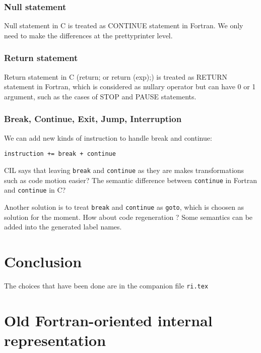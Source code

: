 \documentclass[a4paper]{report}
\begin{document}
\subsection{Null statement}
Null statement in C is treated as CONTINUE statement in Fortran. We only need to make the
differences at the prettyprinter level. 

\subsection{Return statement}
Return statement in C (return; or return (exp);) is treated as RETURN statement in Fortran, which is
considered as nullary operator but can have 0 or 1 argument, such as the
cases of STOP and PAUSE statements. 

\subsection{Break, Continue, Exit, Jump, Interruption}

We can add new kinds of instruction to handle break and continue: 

\verb/instruction += break + continue /

CIL says that leaving \verb/break/ and \verb/continue/ as they are  makes transformations such as code motion
easier? The semantic difference between \verb/continue/ in Fortran and
\verb/continue/ in C?

Another solution is to treat \verb/break/ and \verb/continue/ as
\verb/goto/, which is choosen as solution for the moment. How about code
regeneration ? Some semantics can be added into the generated label names.

\chapter*{Conclusion}

\nocite{Kern78, Necu02}

The choices that have been done are in the companion file \texttt{ri.tex}


\appendix{}

\chapter{Old Fortran-oriented internal representation}
\end{document}
